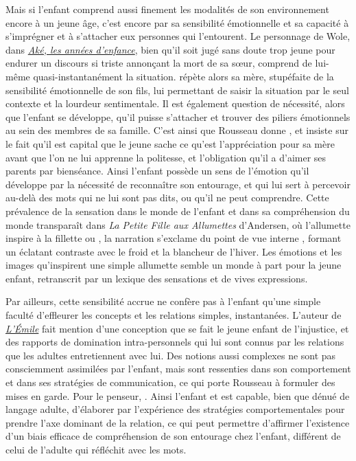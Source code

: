\documentclass[a4paper,french,bookmarks]{article}
\begin{document}
\qquad Mais si l'enfant comprend aussi finement les modalités de son environnement encore à un jeune âge, c'est encore par sa sensibilité émotionnelle et sa capacité à s'imprégner et à s'attacher eux personnes qui l'entourent. Le personnage de Wole, dans \underline{\itshape Aké, les années d'enfance}, bien qu'il soit jugé sans doute trop jeune pour endurer un discours si triste annonçant la mort de sa sœur, comprend de lui-même quasi-instantanément la situation.  répète alors sa mère, stupéfaite de la sensibilité émotionnelle de son fils, lui permettant de saisir la situation par le seul contexte et la lourdeur sentimentale. Il est également question de nécessité, alors que l'enfant se développe, qu'il puisse s'attacher et trouver des piliers émotionnels au sein des membres de sa famille. C'est ainsi que Rousseau donne , et insiste sur le fait qu'il est capital que le jeune sache ce qu'est l'appréciation pour sa mère avant que l'on ne lui apprenne la politesse, et l'obligation qu'il a d'aimer ses parents par bienséance. Ainsi l'enfant possède un sens de l'émotion qu'il développe par la nécessité de reconnaître son entourage, et qui lui sert à percevoir au-delà des mots qui ne lui sont pas dits, ou qu'il ne peut comprendre. Cette prévalence de la sensation dans le monde de l'enfant et dans sa compréhension du monde transparaît dans \textit{La Petite Fille aux Allumettes} d'Andersen, où l'allumette  inspire à la fillette  ou , la narration s'exclame du point de vue interne , formant un éclatant contraste avec le froid et la blancheur de l'hiver. Les émotions et les images qu'inspirent une simple allumette semble un monde à part pour la jeune enfant, retranscrit par un lexique des sensations et de vives expressions.  

\qquad Par ailleurs, cette sensibilité accrue ne confère pas à l'enfant qu'une simple faculté d'effleurer les concepts et les relations simples, instantanées. L'auteur de \underline{\itshape L'Émile} fait mention d'une conception que se fait le jeune enfant de l'injustice, et des rapports de domination intra-personnels qui lui sont connus par les relations que les adultes entretiennent avec lui. Des notions aussi complexes ne sont pas consciemment assimilées par l'enfant, mais sont ressenties dans son comportement et dans ses stratégies de communication, ce qui porte Rousseau à formuler des mises en garde. Pour le penseur, . Ainsi l'enfant et est capable, bien que dénué de langage adulte, d'élaborer par l'expérience des stratégies comportementales pour prendre l'axe dominant de la relation, ce qui peut permettre d'affirmer l'existence d'un biais efficace de compréhension de son entourage chez l'enfant, différent de celui de l'adulte qui réfléchit avec les mots. 
\end{document}
